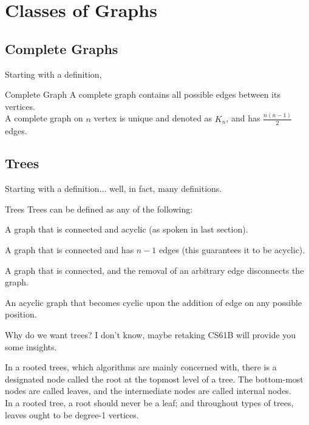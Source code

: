 \section{Classes of Graphs}

\subsection{Complete Graphs}
Starting with a definition,
\begin{ln-define}{Complete Graph}{}
    A complete graph contains all possible edges between its vertices. \\
    A complete graph on $n$ vertex is unique and denoted as $K_n$, and has $\frac{n(n-1)}{2} $edges.
\end{ln-define}

\subsection{Trees}
Starting with a definition$\dots$ well, in fact, many definitions.
\begin{ln-define}{Trees}{}
    Trees can be defined as any of the following:
    \begin{bindenum}
        \item A graph that is connected and acyclic (as spoken in last section).
        \item A graph that is connected and has $n - 1$ edges (this guarantees it to be acyclic).
        \item A graph that is connected, and the removal of an arbitrary edge disconnects the graph.
        \item An acyclic graph that becomes cyclic upon the addition of edge on any possible position.
    \end{bindenum}
\end{ln-define}
Why do we want trees? I don't know, maybe retaking CS61B will provide you some insights.

In a rooted trees, which algorithms are mainly concerned with, there is a designated node called the root at the topmost level of a tree. The bottom-most nodes are called leaves, and the intermediate nodes are called internal nodes. \\
In a rooted tree, a root should never be a leaf; and throughout types of trees, leaves ought to be degree-1 vertices.

